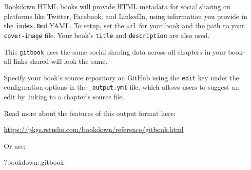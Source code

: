 \documentclass[
]{book}
\newenvironment{Shaded}{\begin{snugshade}}{\end{snugshade}}
\newcommand{\NormalTok}[1]{#1}
\newcommand{\SpecialCharTok}[1]{\textcolor[rgb]{0.00,0.00,0.00}{#1}}
\begin{document}
Bookdown HTML books will provide HTML metadata for social sharing on platforms like Twitter, Facebook, and LinkedIn, using information you provide in the \texttt{index.Rmd} YAML. To setup, set the \texttt{url} for your book and the path to your \texttt{cover-image} file. Your book's \texttt{title} and \texttt{description} are also used.

This \texttt{gitbook} uses the same social sharing data across all chapters in your book- all links shared will look the same.

Specify your book's source repository on GitHub using the \texttt{edit} key under the configuration options in the \texttt{\_output.yml} file, which allows users to suggest an edit by linking to a chapter's source file.

Read more about the features of this output format here:

\url{https://pkgs.rstudio.com/bookdown/reference/gitbook.html}

Or use:

\begin{Shaded}
\begin{Highlighting}[]
\NormalTok{?bookdown}\SpecialCharTok{::}\NormalTok{gitbook}
\end{Highlighting}
\end{Shaded}
\end{document}
